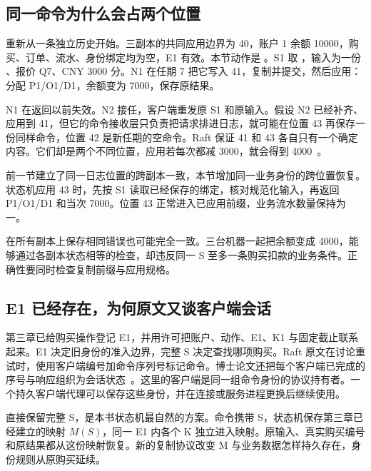 \subsection*{同一命令为什么会占两个位置}

重新从一条独立历史开始。三副本的共同应用边界为 40，账户 1 余额 10000，购买、订单、流水、身份绑定均为空，E1 有效。本节动作是 。S1 取 ，输入为一份 、报价 Q7、CNY 3000 分。N1 在任期 7 把它写入 41，复制并提交，然后应用：分配 P1/O1/D1，余额变为 7000，保存原结果。

N1 在返回以前失效。N2 接任，客户端重发原 S1 和原输入。假设 N2 已经补齐、应用到 41，但它的命令接收层只负责把请求排进日志，就可能在位置 43 再保存一份同样命令，位置 42 是新任期的空命令。Raft 保证 41 和 43 各自只有一个确定内容。它们却是两个不同位置，应用若每次都减 3000，就会得到 4000~\cite{raft,ongaro}。

前一节建立了同一日志位置的跨副本一致，本节增加同一业务身份的跨位置恢复。状态机应用 43 时，先按 S1 读取已经保存的绑定，核对规范化输入，再返回 P1/O1/D1 和当次 7000。位置 43 正常进入已应用前缀，业务流水数量保持为一。


在所有副本上保存相同错误也可能完全一致。三台机器一起把余额变成 4000，能够通过各副本状态相等的检查，却违反同一 S 至多一条购买扣款的业务条件。正确性要同时检查复制前缀与应用规格。

\subsection*{E1 已经存在，为何原文又谈客户端会话}

第三章已给购买操作登记 E1，并用许可把账户、动作、E1、K1 与固定截止联系起来。E1 决定旧身份的准入边界，完整 S 决定查找哪项购买。Raft 原文在讨论重试时，使用客户端编号加命令序列号标记命令。博士论文还把每个客户端已完成的序号与响应组织为会话状态~\cite{raft,ongaro}。这里的客户端是同一组命令身份的协议持有者。一个持久客户端代理可以保存这些身份，并在连接或服务进程更换后继续使用。

直接保留完整 S，是本书状态机最自然的方案。命令携带 S，状态机保存第三章已经建立的映射 $M(S)$，同一 E1 内各个 K 独立进入映射。原输入、真实购买编号和原结果都从这份映射恢复。新的复制协议改变 M 与业务数据怎样持久存在，身份规则从原购买延续。

